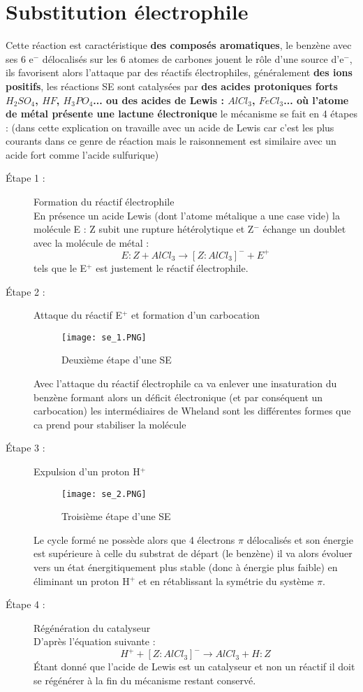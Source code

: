 \documentclass[a4paper, oneside]{book}
\begin{document}
\section{Substitution électrophile}
Cette réaction est caractéristique \textbf{des composés aromatiques}, le benzène avec ses 6 e$^-$ délocalisés sur les 6 atomes de carbones jouent le rôle d'une source d'e$^-$, ils favorisent alors l'attaque par des réactifs électrophiles, généralement \textbf{des ions positifs}, les réactions SE sont catalysées par \textbf{des acides protoniques forts $H_2SO_4$, $HF$, $H_3PO_4$... ou des acides de Lewis : $AlCl_3$, $FeCl_3$... où l'atome de métal présente une lactune électronique} le mécanisme se fait en 4 étapes : (dans cette explication on travaille avec un acide de Lewis car c'est les plus courants dans ce genre de réaction mais le raisonnement est similaire avec un acide fort comme l'acide sulfurique)
\begin{description}
    \item[\'Etape 1 :] Formation du réactif électrophile\\
    En présence un acide Lewis (dont l'atome métalique a une case vide) la molécule E : Z subit une rupture hétérolytique et Z$^-$ échange un doublet avec la molécule de métal :
    \[
        E : Z + AlCl_3 \longrightarrow [Z : AlCl_3]^- + E^+
    \]
    tels que le E$^+$ est justement le réactif électrophile.
    \item[\'Etape 2 :] Attaque du réactif E$^+$ et formation d'un carbocation 
    \begin{figure}[!h]
        \centering
        \texttt{[image: se\_1.PNG]}
        \caption{Deuxième étape d'une SE}
        \label{fig:my_label}
    \end{figure}
    Avec l'attaque du réactif électrophile ca va enlever une insaturation du benzène formant alors un déficit électronique (et par conséquent un carbocation) les intermédiaires de Wheland sont les différentes formes que ca prend pour stabiliser la molécule
    \item[\'Etape 3 :] Expulsion d'un proton H$^+$
    \begin{figure}[!h]
        \centering
        \texttt{[image: se\_2.PNG]}
        \caption{Troisième étape d'une SE}
        \label{fig:my_label}
    \end{figure}
    
    Le cycle formé ne possède alors que 4 électrons $\pi$ délocalisés et son énergie est supérieure à celle du substrat de départ (le benzène) il va alors évoluer vers un état énergitiquement plus stable (donc à énergie plus faible) en éliminant un proton H$^+$ et en rétablissant la symétrie du système $\pi$.
    \item[\'Etape 4 :] Régénération du catalyseur\\
    D'après l'équation suivante :
    \[
        H^+ + [Z : AlCl_3]^- \longrightarrow AlCl_3 + H : Z
    \]
    \'Etant donné que l'acide de Lewis est un catalyseur et non un réactif il doit se régénérer à la fin du mécanisme restant conservé.
\end{description}
\end{document}
